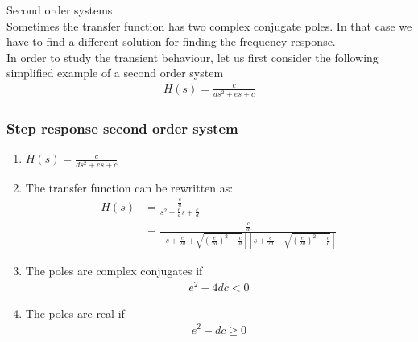 \begin{frame}{Second order systems} 
\vspace{-0.5cm}
\\ Sometimes the transfer function has two complex conjugate poles. In that case we have to find a different solution for finding the frequency response.
\pause
\vspace{1cm}
\\ In order to study the transient behaviour, let us first consider the following simplified example of a second order system
\\ 
\begin{align*}
H(s) = \frac{c}{ds^2+es+c}
\end {align*}
\vspace{-0.5cm}
\end{frame}

\begin{frame}
\frametitle{Step response second order system}
\begin{enumerate}
\item $H(s) = \frac{c}{ds^2+es+c}$
\vspace{0.45cm}
\pause
\item The transfer function can be rewritten as:
\\ 
\begin{align*}
H(s) &= \frac{\frac{c}{d}}{s^2+\frac{e}{d}s+\frac{c}{d}}
\\ &= \frac{\frac{c}{d}}{[s+\frac{e}{2d}+\sqrt{(\frac{e}{2d})^2-\frac{c}{d}}][s+\frac{e}{2d}-\sqrt{(\frac{e}{2d})^2-\frac{c}{d}}]}
\end{align*}
\pause
\item The poles are complex conjugates if
\\ \vspace{-0.15cm}
\begin{align*}
e^2 -4dc <0
\end{align*}
\pause
\item The poles are real if
\\
\vspace{-0.25cm}
\begin{align*}
e^2 -dc\ge 0
\end{align*}
\end{enumerate}
\end{frame}


